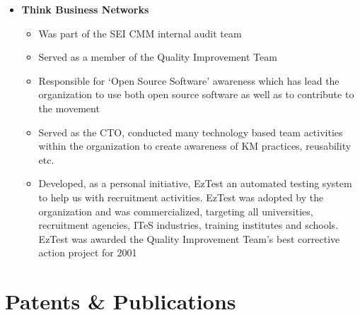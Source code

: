 \documentclass[a4paper,12pt]{article}
\begin{document}
\begin{itemize}
\begin{itemize}
    \end{itemize}

  \item{\textbf{Think Business Networks}}

    \begin{itemize}
      
      \setlength\itemsep{-0.5em}
      
      \item Was part of the SEI CMM internal audit team 

      \item Served as a member of the Quality Improvement Team 

      \item Responsible for `Open Source Software' awareness which has
        lead the organization to use both open source software as well
        as to contribute to the movement

      \item Served as the CTO, conducted many technology based team
        activities within the organization to create awareness of KM
        practices, reusability etc.

      \item Developed, as a personal initiative, EzTest an automated
        testing system to help us with recruitment activities. EzTest
        was adopted by the organization and was commercialized,
        targeting all universities, recruitment agencies, ITeS
        industries, training institutes and schools. EzTest was
        awarded the Quality Improvement Team's best corrective action
        project for 2001
        
    \end{itemize}
\end{itemize}

\section*{Patents \& Publications}
\end{document}
